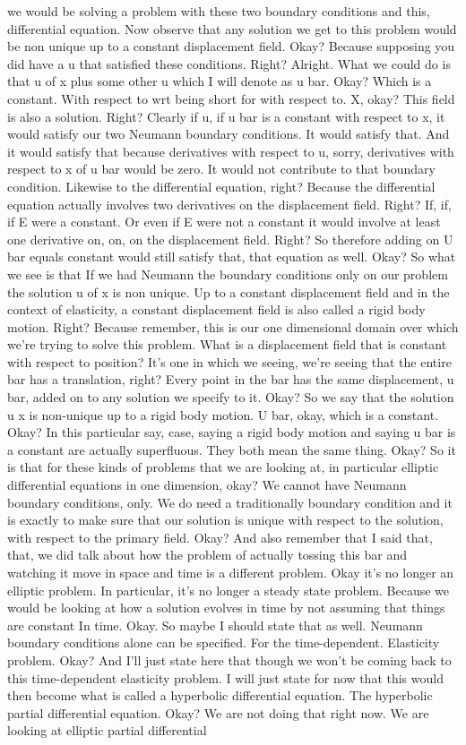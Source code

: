 \documentclass[10pt]{article}
\begin{document}
we would be solving a problem with these two boundary conditions and this, differential equation. Now observe that any solution we get to this problem would be non unique up to a constant displacement field. Okay? Because supposing you did have a u that satisfied these conditions. Right? Alright. What we could do is that u of x plus some other u which I will denote as u bar. Okay? Which is a constant. With respect to wrt being short for with respect to. X, okay? This field is also a solution. Right? Clearly if u, if u bar is a constant with respect to x, it would satisfy our two Neumann boundary conditions. It would satisfy that. And it would satisfy that because derivatives with respect to u, sorry, derivatives with respect to x of u bar would be zero. It would not contribute to that boundary condition. Likewise to the differential equation, right? Because the differential equation actually involves two derivatives on the displacement field. Right? If, if, if E were a constant. Or even if E were not a constant it would involve at least one derivative on, on, on the displacement field. Right? So therefore adding on U bar equals constant would still satisfy that, that equation as well. Okay? So what we see is that If we had Neumann the boundary conditions only on our problem the solution u of x is non unique.  Up to a constant displacement field and in the context of elasticity, a constant displacement field is also called a rigid body motion. Right? Because remember, this is our one dimensional domain over which we're trying to solve this problem. What is a displacement field that is constant with respect to position? It's one in which we seeing, we're seeing that the entire bar has a translation, right? Every point in the bar has the same displacement, u bar, added on to any solution we specify to it. Okay? So we say that the solution u x is non-unique up to a rigid body motion. U bar, okay, which is a constant. Okay? In this particular say, case, saying a rigid body motion and saying u bar is a constant are actually superfluous. They both mean the same thing. Okay? So it is that for these kinds of problems that we are looking at, in particular elliptic differential equations in one dimension, okay? We cannot have Neumann boundary conditions, only. We do need a traditionally boundary condition and it is exactly to make sure that our solution is unique with respect to the solution, with respect to the primary field. Okay? And also remember that I said that, that, we did talk about how the problem of actually tossing this bar and watching it move in space and time is a different problem. Okay it's no longer an elliptic problem. In particular, it's no longer a steady state problem. Because we would be looking at how a solution evolves in time by not assuming that things are constant In time. Okay. So maybe I should state that as well. Neumann boundary conditions alone can be specified. For the time-dependent. Elasticity problem. Okay? And I'll just state here that though we won't be coming back to this time-dependent elasticity problem. I will just state for now that this would then become what is called a hyperbolic differential equation. The hyperbolic partial differential equation. Okay? We are not doing that right now. We are looking at elliptic partial differential 
\end{document}
